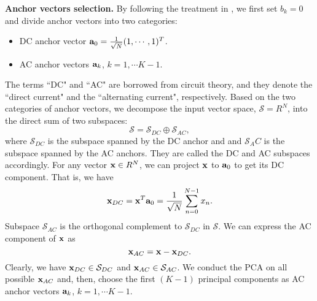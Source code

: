 \documentclass[preprint,12pt]{elsarticle}
\begin{document}
{\bf Anchor vectors selection.} By following the treatment in
\cite{kuo2016understanding, kuo2017cnn, kuo2018data}, we first set
$b_k=0$ and divide anchor vectors into two categories:
\begin{itemize}
\item DC anchor vector ${\bf a}_0 = \frac{1}{\sqrt{N}} (1, \cdots, 1)^T$.
\item AC anchor vectors ${\bf a}_k$, $k=1, \cdots K-1$.
\end{itemize}
The terms ``DC" and ``AC" are borrowed from circuit theory, and they
denote the ``direct current" and the ``alternating current",
respectively. Based on the two categories of anchor vectors, we
decompose the input vector space, $\mathcal{S}=R^N$, into the direct sum
of two subspaces:
\begin{equation}\label{eq:space_decomposition}
\mathcal{S}=\mathcal{S}_{DC} \oplus \mathcal{S}_{AC},
\end{equation}
where $\mathcal{S}_{DC}$ is the subspace spanned by the DC anchor and
and $\mathcal{S}_AC$ is the subspace spanned by the AC anchors.  They
are called the DC and AC subspaces accordingly.  For any vector ${\bf x}
\in R^N$, we can project ${\bf x}$ to ${\bf a}_0$ to get its DC
component. That is, we have
\begin{equation}\label{eq:mean}
{\bf x}_{DC}={\bf x}^T {\bf a}_0 = \frac{1}{\sqrt{N}} \sum_{n=0}^{N-1} x_n.
\end{equation}
Subspace $\mathcal{S}_{AC}$ is the orthogonal complement to
$\mathcal{S}_{DC}$ in $\mathcal{S}$. We can express the AC component of
${\bf x}$ as
\begin{equation}\label{eq:AC}
{\bf x}_{AC}={\bf x} - {\bf x}_{DC}.
\end{equation}
Clearly, we have ${\bf x}_{DC} \in \mathcal{S}_{DC}$ and ${\bf x}_{AC}
\in \mathcal{S}_{AC}$. We conduct the PCA on all possible ${\bf x}_{AC}$
and, then, choose the first $(K-1)$ principal components as AC anchor
vectors ${\bf a}_k$, $k=1, \cdots K-1$. 
\end{document}
